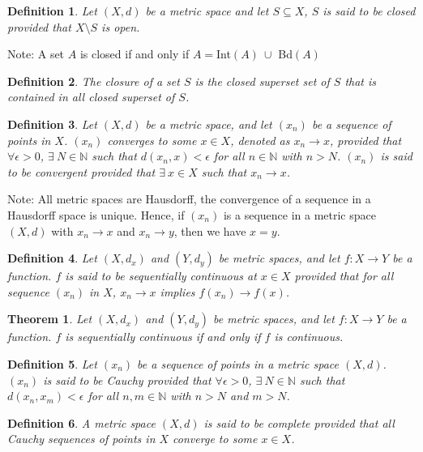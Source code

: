 \documentclass[15pt]{book}
\theoremstyle{break}
\theoremstyle{break}
\newtheorem{thm}{Theorem}[section]
\newtheorem{defn}{Definition}[corL]
\newcommand{\N}{\mathbb{N}}
\newcommand{\note}{\color{red}Note: \color{black}}
\begin{document}
\begin{defn}
Let $(X,d)$ be a metric space and let $S\subseteq X$, $S$ is said to be closed provided that $X\setminus S$ is open. 
\end{defn}

\note A set $A$ is closed if and only if $A=$Int$(A)\ \cup$ Bd$(A)$

\begin{defn}
The closure of a set $S$ is the closed superset set of $S$ that is contained in all closed superset of $S$.
\end{defn}

\begin{defn}
Let $(X,d)$ be a metric space, and let $(x_n)$ be a sequence of points in $X$. $(x_n)$ converges to some $x\in X$, denoted as $x_n\to x$, provided that $\forall \epsilon>0$, $\exists\ N \in \N$ such that $d(x_n,x)<\epsilon$ for all $n\in \N$ with $n>N$. $(x_n)$ is said to be convergent provided that $\exists\ x \in X$ such that $x_n \to x$. 
\end{defn}
\note All metric spaces are Hausdorff, the convergence of a sequence in a Hausdorff space is unique. Hence, if $(x_n)$ is a sequence in a metric space $(X,d)$ with $x_n \to x$ and $x_n \to y$, then we have $x=y$.

\begin{defn}
Let $(X,d_x)$ and $(Y,d_y)$ be metric spaces, and let $f:X\to Y$ be a function. $f$ is said to be sequentially continuous at $x\in X$ provided that for all sequence $(x_n)$ in $X$, $x_n \to x$ implies $f(x_n) \to f(x)$.
\end{defn}

\begin{thm}
Let $(X,d_x)$ and $(Y,d_y)$ be metric spaces, and let $f:X\to Y$ be a function. $f$ is sequentially continuous if and only if $f$ is continuous.
\end{thm}

\begin{defn}
Let $(x_n)$ be a sequence of points in a metric space $(X,d)$. $(x_n)$ is said to be Cauchy provided that $\forall \epsilon>0$, $\exists\ N \in \N$ such that $d(x_n,x_m)< \epsilon$ for all $n,m\in\N$ with $n>N$ and $m>N$.
\end{defn}

\begin{defn}
A metric space $(X,d)$ is said to be complete provided that all Cauchy sequences of points in $X$ converge to some $x\in X$.
\end{defn}
\end{document}
